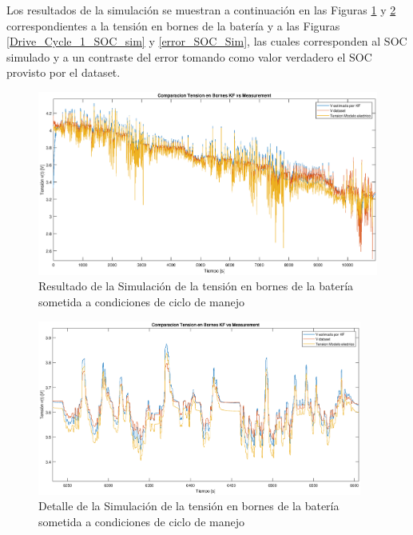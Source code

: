 \documentclass[10pt,a4paper]{article}
\begin{document}
	Los resultados de la simulación se muestran a continuación en las Figuras \ref{Tension_sim} y \ref{Tension_sim_zoom} correspondientes a la tensión en bornes de la batería y  a las Figuras \ref{Drive_Cycle_1_SOC_sim} y \ref{error_SOC_Sim}, las cuales corresponden al SOC simulado y a un contraste del error tomando como valor verdadero el SOC provisto por el dataset.
	
	\begin{figure}[h!]
		\begin{center}
			\includegraphics[width=1\textwidth]{Tension_Sim.eps}
			\caption{Resultado de la Simulación de la tensión en bornes de la batería sometida a condiciones de ciclo de manejo}
			\label{Tension_sim}
		\end{center}
	\end{figure}
	
	\begin{figure}[h!]
		\begin{center}
			\includegraphics[width=0.95\textwidth]{Tension_Sim_zoom.eps}
			\caption{Detalle de la Simulación de la tensión en bornes de la batería sometida a condiciones de ciclo de manejo}
			\label{Tension_sim_zoom}
		\end{center}
	\end{figure}
	
\end{document}
